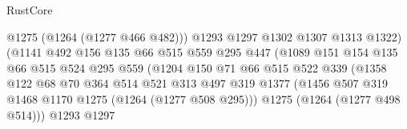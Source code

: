 \begin{lexlean}{RustCore}
\begin{coremodule}
                                        @1275
                                        (@1264 (@1277 @466 @482)))
                                      @1293
                                      @1297
                                      @1302
                                      @1307
                                      @1313
                                      @1322)
                                    (@1141
                                      @492
                                      @156
                                      @135
                                      @66
                                      @515
                                      @559
                                      @295
                                      @447
                                      (@1089
                                        @151
                                        @154
                                        @135
                                        @66
                                        @515
                                        @524
                                        @295
                                        @559
                                        (@1204
                                          @150
                                          @71
                                          @66
                                          @515
                                          @522
                                          @339
                                          (@1358
                                            @122
                                            @68
                                            @70
                                            @364
                                            @514
                                            @521
                                            @313
                                            @497
                                            @319
                                            @1377
                                            (@1456
                                              @507
                                              @319
                                              @1468
                                              @1170
                                              @1275
                                              (@1264 (@1277 @508 @295)))
                                            @1275
                                            (@1264 (@1277 @498 @514)))
                                          @1293
                                          @1297

\end{coremodule}
\end{lexlean}
